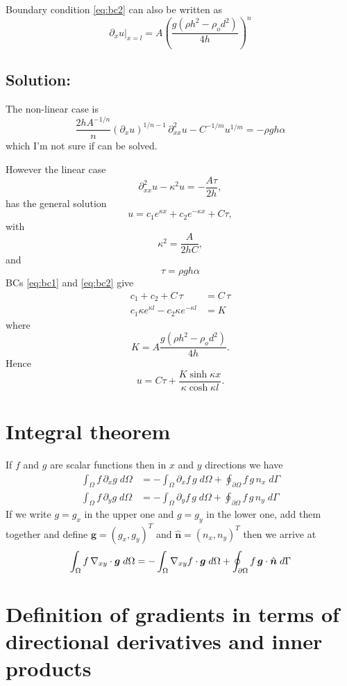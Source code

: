 \documentclass[10pt,a4paper]{book}
\newcommand{\p}{\partial}
\begin{document}
Boundary condition \eqref{eq:bc2} can also be written as
\[
\p_x u |_{x=l} = A \left ( \frac{g (\rho h^2- \rho_o d^2)}{4 h} \right )^n
\]


\section{Solution:}
The non-linear case is
\[
\frac{2 h A^{-1/n}}{n} (\p_x u)^{1/n-1} \, \p^2_{xx} u- C^{-1/m} u^{1/m}  = - \rho g h \alpha
\]
which I'm not sure if can be solved.

However the linear case
\[
\p^2_{xx} u - \kappa^2 u  = - \frac{A \tau}{2 h} ,
\]
has the general solution
\[
u=c_1 e^{\kappa x} + c_2 e^{-\kappa x} + C \tau ,
\]
with
\[
\kappa^2=\frac{A}{2hC} ,
\]
and
\[ \tau=\rho g h \alpha \]
BCs \eqref{eq:bc1} and \eqref{eq:bc2} give
\begin{align*}
c_1 + c_2 + C \, \tau&= C \, \tau \\
c_1 \kappa e^{\kappa l} - c_2 \kappa e^{-\kappa l} &= K
\end{align*}
where
\[
K=A \frac{ g (\rho h^2- \rho_o d^2)}{4 h} .
\]
Hence
\[
u=C \tau +\frac{K \sinh \kappa x}{\kappa \cosh \kappa l}.
\]



\chapter{Integral theorem}

If $f$ and $g$ are scalar functions then in $x$ and $y$ directions we have
\begin{align}
\int_{\Omega} f \, \p_x g \; d \Omega &= - \int_{\Omega} \p_x f \, g \; d \Omega + \oint_{\p \Omega} f \, g \, n_x \; d \Gamma \\
\int_{\Omega} f \, \p_y g \; d \Omega &= - \int_{\Omega} \p_y f \, g \; d \Omega + \oint_{\p \Omega} f \, g \, n_y \; d \Gamma
\end{align}
If we write $g=g_x$ in the upper one and $g=g_y$ in the lower one, add
them together and define $\bm{g}=(g_x,g_y)^T$ and
$\hat{\bm{n}}=(n_x,n_y)^T$ then we arrive at
\begin{equation}
\int_{\Omega} f \, \nabla_{xy} \cdot \bm{g} \; d \Omega = -
\int_{\Omega} \nabla_{xy} f \cdot \bm{g} \; d \Omega + \oint_{\p
  \Omega} f \, \bm{g} \cdot \hat{\bm{n}} \; d \Gamma \\
\label{eq:fgg}
\end{equation}



\chapter{Definition of gradients in terms of directional derivatives and inner products}
\end{document}
